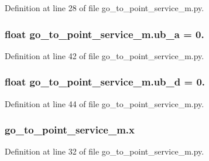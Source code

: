 Definition at line 28 of file go\+\_\+to\+\_\+point\+\_\+service\+\_\+m.\+py.

\subsubsection[{\texorpdfstring{ub\+\_\+a}{ub_a}}]{\setlength{\rightskip}{0pt plus 5cm}float go\+\_\+to\+\_\+point\+\_\+service\+\_\+m.\+ub\+\_\+a = 0.}\hypertarget{namespacego__to__point__service__m_ac8de1564925338ead12be0a3763b4119}{}\label{namespacego__to__point__service__m_ac8de1564925338ead12be0a3763b4119}


Definition at line 42 of file go\+\_\+to\+\_\+point\+\_\+service\+\_\+m.\+py.

\subsubsection[{\texorpdfstring{ub\+\_\+d}{ub_d}}]{\setlength{\rightskip}{0pt plus 5cm}float go\+\_\+to\+\_\+point\+\_\+service\+\_\+m.\+ub\+\_\+d = 0.}\hypertarget{namespacego__to__point__service__m_aba661cc0f865736231acaf5b56101b35}{}\label{namespacego__to__point__service__m_aba661cc0f865736231acaf5b56101b35}


Definition at line 44 of file go\+\_\+to\+\_\+point\+\_\+service\+\_\+m.\+py.

\subsubsection[{\texorpdfstring{x}{x}}]{\setlength{\rightskip}{0pt plus 5cm}go\+\_\+to\+\_\+point\+\_\+service\+\_\+m.\+x}\hypertarget{namespacego__to__point__service__m_a3ec6e272b02c0f40a625358965caf70b}{}\label{namespacego__to__point__service__m_a3ec6e272b02c0f40a625358965caf70b}


Definition at line 32 of file go\+\_\+to\+\_\+point\+\_\+service\+\_\+m.\+py.

